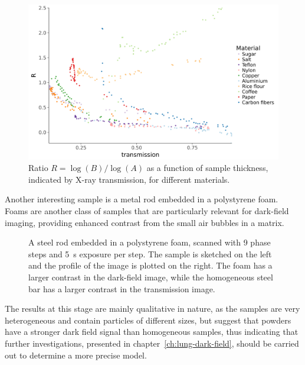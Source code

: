 \begin{figure}[ht]
    \centering
    \includegraphics[width=\textwidth]{gfx/powders-aggregated.png}
    \caption{Ratio $R = \log(B) / \log(A)$ as a function of sample
    thickness, indicated by X-ray transmission, for different materials.}
    \label{fig:powders}
\end{figure}

Another interesting sample is a metal rod embedded in a polystyrene foam.
Foams are another class of samples that are particularly relevant for
dark-field imaging, providing enhanced contrast from the small air bubbles
in a matrix.

\begin{figure}[h!]
    \centering
    \begin{subfigure}[b]{.49\textwidth}
        \resizebox{\textwidth}{!}{}
        \caption{}
    \end{subfigure}
    \begin{subfigure}[b]{.49\textwidth}
        \resizebox{\textwidth}{!}{}
        \caption{}
    \end{subfigure}
    \caption{A steel rod embedded in a polystyrene foam, scanned with \num{9} phase
steps and \SI{5}{\second} exposure per step. The sample is sketched on the
left and the profile of the image is plotted on the right. The foam has a larger contrast
in the dark-field image, while the homogeneous steel bar has a larger
contrast in the transmission image.}
\end{figure}

The results at this stage are mainly qualitative in nature, as the samples
are very heterogeneous and contain particles of different sizes, but suggest
that powders have a stronger dark field signal than homogeneous samples,
thus indicating that further investigations, presented in
chapter~\ref{ch:lung-dark-field}, should be carried out to determine a more
precise model.

